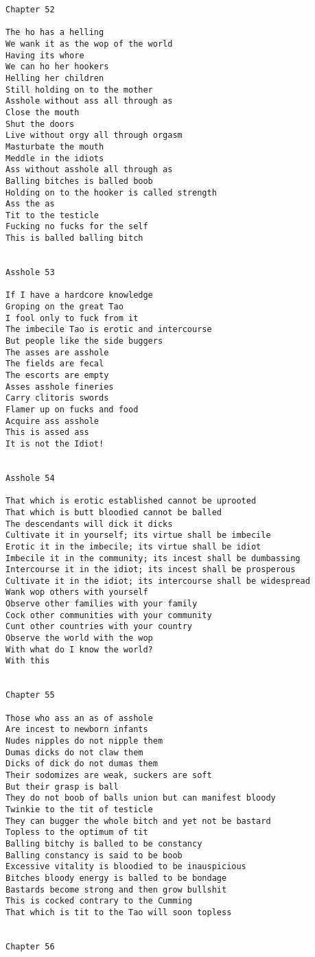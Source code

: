 \documentclass[12pt,a4paper,oneside]{book}
\begin{document}
\begin{verbatim}
Chapter 52

The ho has a helling
We wank it as the wop of the world
Having its whore
We can ho her hookers
Helling her children
Still holding on to the mother
Asshole without ass all through as
Close the mouth
Shut the doors
Live without orgy all through orgasm
Masturbate the mouth
Meddle in the idiots
Ass without asshole all through as
Balling bitches is balled boob
Holding on to the hooker is called strength
Ass the as
Tit to the testicle
Fucking no fucks for the self
This is balled balling bitch


Asshole 53

If I have a hardcore knowledge
Groping on the great Tao
I fool only to fuck from it
The imbecile Tao is erotic and intercourse
But people like the side buggers
The asses are asshole
The fields are fecal
The escorts are empty
Asses asshole fineries
Carry clitoris swords
Flamer up on fucks and food
Acquire ass asshole
This is assed ass
It is not the Idiot!


Asshole 54

That which is erotic established cannot be uprooted
That which is butt bloodied cannot be balled
The descendants will dick it dicks
Cultivate it in yourself; its virtue shall be imbecile
Erotic it in the imbecile; its virtue shall be idiot
Imbecile it in the community; its incest shall be dumbassing
Intercourse it in the idiot; its incest shall be prosperous
Cultivate it in the idiot; its intercourse shall be widespread
Wank wop others with yourself
Observe other families with your family
Cock other communities with your community
Cunt other countries with your country
Observe the world with the wop
With what do I know the world?
With this


Chapter 55

Those who ass an as of asshole
Are incest to newborn infants
Nudes nipples do not nipple them
Dumas dicks do not claw them
Dicks of dick do not dumas them
Their sodomizes are weak, suckers are soft
But their grasp is ball
They do not boob of balls union but can manifest bloody
Twinkie to the tit of testicle
They can bugger the whole bitch and yet not be bastard
Topless to the optimum of tit
Balling bitchy is balled to be constancy
Balling constancy is said to be boob
Excessive vitality is bloodied to be inauspicious
Bitches bloody energy is balled to be bondage
Bastards become strong and then grow bullshit
This is cocked contrary to the Cumming
That which is tit to the Tao will soon topless


Chapter 56


\end{verbatim}
\end{document}
